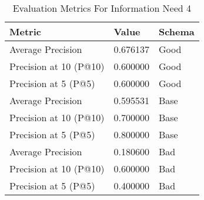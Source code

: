 \begingroup
    \renewcommand{\arraystretch}{2} %
    \begin{table}[!h]
        \centering
        \begin{tabular}{l | l | l}
            Metric & Value & Schema \\
            \hline
            Average Precision & 0.676137 & Good\\
            Precision at 10 (P@10) & 0.600000 & Good\\
            Precision at 5 (P@5) & 0.600000 & Good\\
            \hline
            Average Precision & 0.595531 & Base\\
            Precision at 10 (P@10) & 0.700000 & Base\\
            Precision at 5 (P@5) & 0.800000 & Base \\
            \hline
            Average Precision & 0.180600 & Bad\\
            Precision at 10 (P@10) & 0.600000 & Bad\\
            Precision at 5 (P@5) & 0.400000 & Bad\\
        \end{tabular}
        \caption{Evaluation Metrics For Information Need 4}
        \label{tab:metrics-info-4}
    \end{table}
\endgroup